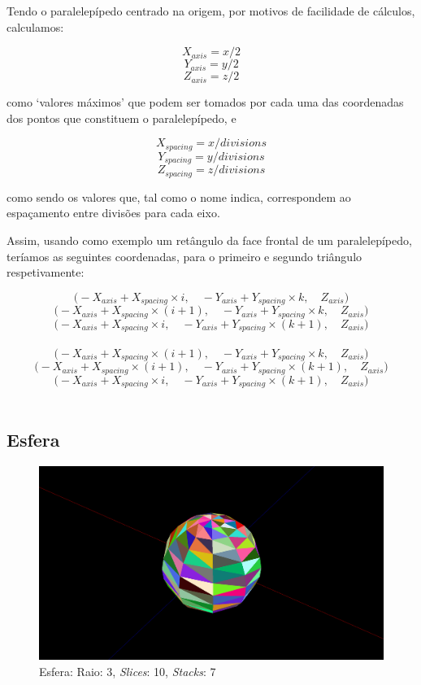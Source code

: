 \documentclass[a4paper]{article}
\newcommand{\x}{\times}
\begin{document}
Tendo o paralelepípedo centrado na origem, por motivos de facilidade de cálculos, calculamos:

\[X_{axis} = x / 2\]
\[Y_{axis} = y / 2\]
\[Z_{axis} = z / 2\]

como `valores máximos' que podem ser tomados por cada uma das coordenadas dos pontos que constituem o paralelepípedo, e

\[X_{spacing} = x / divisions\]
\[Y_{spacing} = y / divisions\]
\[Z_{spacing} = z / divisions\]

como sendo os valores que, tal como o nome indica, correspondem ao espaçamento entre divisões para cada eixo.

Assim, usando como exemplo um retângulo da face frontal de um paralelepípedo, teríamos as seguintes coordenadas, para o primeiro e segundo triângulo respetivamente:

\[\Big(-X_{axis} + X_{spacing} \x i,\quad -Y_{axis} + Y_{spacing} \x k, \quad Z_{axis}\Big)\]
\[\Big(-X_{axis} + X_{spacing} \x (i+1),\quad -Y_{axis} + Y_{spacing} \x k, \quad Z_{axis}\Big)\]
\[\Big(-X_{axis} + X_{spacing} \x i,\quad -Y_{axis} + Y_{spacing} \x (k+1),\quad Z_{axis}\Big)\]
\\
\[\Big(-X_{axis} + X_{spacing} \x (i+1),\quad -Y_{axis} + Y_{spacing} \x k,\quad Z_{axis}\Big)\]
\[\Big(-X_{axis} + X_{spacing} \x (i+1),\quad -Y_{axis} + Y_{spacing} \x (k+1),\quad Z_{axis}\Big)\]
\[\Big(-X_{axis} + X_{spacing} \x i,\quad -Y_{axis} + Y_{spacing} \x (k+1),\quad Z_{axis}\Big)\]
\\
\subsection{Esfera}

\begin{figure}[H]
    \centering
    \includegraphics[width=\textwidth]{sphere.png}
    \caption{Esfera: Raio: 3, \textit{Slices}: 10, \textit{Stacks}: 7}
\end{figure}
\end{document}
